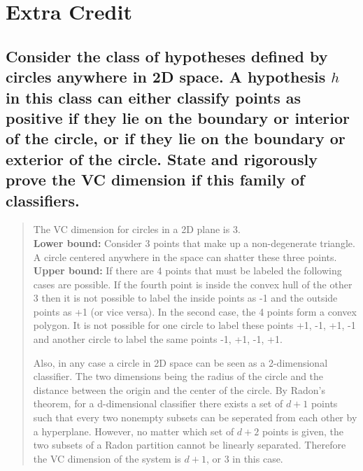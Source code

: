 \documentclass[11pt]{article}
\begin{document}
\section{Extra Credit}

\subsection{Consider the class of hypotheses defined by circles anywhere in 2D space. A hypothesis $h$ in this class can either classify points as positive if they lie on the boundary or interior of the circle, or if they lie on the boundary or exterior of the circle. State and rigorously prove the VC dimension if this family of classifiers.}
\begin{quote}
	The VC dimension for circles in a 2D plane is 3.
	\\
	\textbf{Lower bound:} Consider 3 points that make up a non-degenerate triangle. A circle centered anywhere in the space can shatter these three points. 
	\\
	\textbf{Upper bound:} If there are 4 points that must be labeled the following cases are possible. If the fourth point is inside the convex hull of the other 3 then it is not possible to label the inside points as -1 and the outside points as +1 (or vice versa). In the second case, the 4 points form a convex polygon. It is not possible for one circle to label these points +1, -1, +1, -1 and another circle to label the same points -1, +1, -1, +1.

	Also, in any case a circle in 2D space can be seen as a 2-dimensional classifier. The two dimensions being the radius of the circle and the distance between the origin and the center of the circle. By Radon's theorem, for a d-dimensional classifier there exists a set of $d+1$ points such that every two nonempty subsets can be seperated from each other by a hyperplane. However, no matter which set of $d+2$ points is given, the two subsets of a Radon partition cannot be linearly separated. Therefore the VC dimension of the system is $d+1$, or 3 in this case.
\end{quote}
\end{document}
